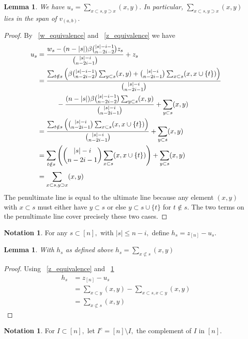 \documentclass[10 pt]{amsart}
\theoremstyle{plain}
\newtheorem{lem}[thm]{Lemma}
\theoremstyle{definition}
\newtheorem{note}[thm]{Notation}
\theoremstyle{remark}
\numberwithin{equation}{section}
\begin{document}
\begin{lem}
\label{u_equivalence}
We have $u_s = \sum_{x\subset s,y\supset x}^{}(x, y).$ In particular, $\sum_{x\subset s,y\supset x}^{}(x, y)$ lies in the span of $v_{(a, b)}.$
\end{lem}
\begin{proof}
By ~\ref{w_equivalence} and ~\ref{z_equivalence} we have
\begin{align*}
	u_s &= \frac{w_s - (n - |s|)\beta \binom {|s|-i-1}{n-2i-2} z_s}{\binom {|s|-i}{n-2i-1}} + z_s\\
	&= \frac{\sum_{t\notin s}^{} \left(\beta \binom {|s|-i-1}{n-2i-2}\sum_{y \subset s}^{}(x, y) + \binom {|s|-i}{n-2i-1}\sum_{x \subset s}^{}(x, x \cup \{t\}) \right)}{\binom {|s|-i}{n-2i-1}} 
	\\
	& \hspace{1 cm}- \frac{(n - |s|)\beta \binom {|s|-i-1}{n-2i-2} \sum_{y \subset s}^{}(x, y)}{\binom {|s|-i}{n-2i-1}}+ \sum_{y \subset s}^{}(x, y) \\
	&=  \frac{\sum_{t\notin s}^{} \left(\binom {|s|-i}{n-2i-1}\sum_{x \subset s}^{}(x, x \cup \{t\}) \right)}{\binom {|s|-i}{n-2i-1}} + \sum_{y \subset s}^{}(x, y) \\
	&= \sum_{t\notin s}^{} \left(\binom {|s|-i}{n-2i-1}\sum_{x \subset s}^{}(x, x \cup \{t\}) \right) + \sum_{y \subset s}^{}(x, y) \\
	&=  \sum_{x\subset s,y\supset x}^{}(x, y)
\end{align*}
The penultimate line is equal to the ultimate line because any element $(x, y)$ with $x \subset s$ must either have $y \subset s$ or else $y \subset s \cup \{t\}$ for $t \notin s.$ The two terms on the penultimate line cover precisely these two cases.
\end{proof}

\begin{note}
For any $s \subset [n],$ with $|s| \leq n-i,$ define $h_s = z_{[n]} - u_s.$
\end{note}

\begin{lem}
\label{h_equivalence}
With $h_s$ as defined above $h_s = \sum_{x\not\subset s}^{}(x, y)$
\end{lem}
\begin{proof}
Using ~\ref{z_equivalence} and ~\ref{u_equivalence}
\begin{align*}
	h_s &= z_{[n]} - u_s \\
	&= \sum_{x\subset y}^{}(x, y)-\sum_{x\subset s,x\subset y}^{}(x, y)\\
	&= \sum_{x\not\subset s}^{}(x, y)
\end{align*}
\end{proof}
\begin{note}
For $I \subset[n],$ let $I^c = [n]\setminus I,$ the complement of $I$ in $[n].$
\end{note}
\end{document}

